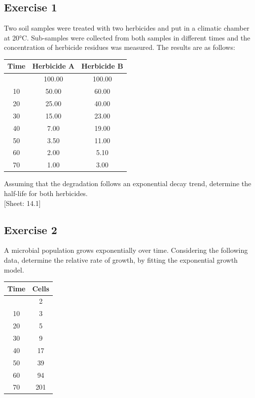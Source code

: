 \documentclass[a4paper,12pt,oneside]{book}
\begin{document}
\hypertarget{exercise-1-9}{%
\subsection{Exercise 1}\label{exercise-1-9}}

Two soil samples were treated with two herbicides and put in a climatic chamber at 20°C. Sub-samples were collected from both samples in different times and the concentration of herbicide residues was measured. The results are as follows:

\begin{longtable}[]{@{}ccc@{}}
\toprule\noalign{}
Time & Herbicide A & Herbicide B \\
\midrule\noalign{}
\endhead
\bottomrule\noalign{}
\endlastfoot
0 & 100.00 & 100.00 \\
10 & 50.00 & 60.00 \\
20 & 25.00 & 40.00 \\
30 & 15.00 & 23.00 \\
40 & 7.00 & 19.00 \\
50 & 3.50 & 11.00 \\
60 & 2.00 & 5.10 \\
70 & 1.00 & 3.00 \\
\end{longtable}

Assuming that the degradation follows an exponential decay trend, determine the half-life for both herbicides.\\
{[}Sheet: 14.1{]}

\hypertarget{exercise-2-9}{%
\subsection{Exercise 2}\label{exercise-2-9}}

A microbial population grows exponentially over time. Considering the following data, determine the relative rate of growth, by fitting the exponential growth model.

\begin{longtable}[]{@{}cc@{}}
\toprule\noalign{}
Time & Cells \\
\midrule\noalign{}
\endhead
\bottomrule\noalign{}
\endlastfoot
0 & 2 \\
10 & 3 \\
20 & 5 \\
30 & 9 \\
40 & 17 \\
50 & 39 \\
60 & 94 \\
70 & 201 \\
\end{longtable}
\end{document}
